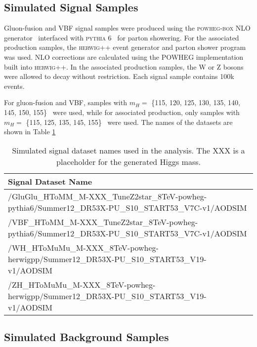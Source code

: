 \subsection{Simulated Signal Samples}

Gluon-fusion and VBF signal samples were produced using the \textsc{powheg-box} NLO generator~\cite{powheg} 
interfaced with \textsc{pythia} 6~\cite{pythia} for parton showering.
For the associated production samples, the \textsc{herwig}++ event generator and 
parton shower program~\cite{herwigpp} was used.  NLO corrections are calculated using the 
POWHEG implementation built into \textsc{herwig}++. 
In the associated production samples, the W or Z bosons were allowed to decay without restriction.
Each signal sample contains 100k events.

For gluon-fusion and VBF, samples with
$m_H =$ \{115, 120, 125, 130, 135, 140, 145, 150, 155\}~\GeVcc 
were used, while for associated production, only samples with 
$m_H =$ \{115, 125, 135, 145, 155\}~\GeVcc
were used.  The names of the datasets are shown in Table \ref{tab:sigDatasets}

\begin{table}[htb]
\caption{Simulated signal dataset names used in the analysis. The XXX is a placeholder
for the generated Higgs mass.
\label{tab:sigDatasets}
}
\small
\begin{center}
\begin{tabular}{ |p{12cm}|}
\hline
Signal Dataset Name \\
\hline
\hline
/GluGlu\_HToMM\_M-XXX\_TuneZ2star\_8TeV-powheg-pythia6/Summer12\_DR53X-PU\_S10\_START53\_V7C-v1/AODSIM \\
\hline
/VBF\_HToMM\_M-XXX\_TuneZ2star\_8TeV-powheg-pythia6/Summer12\_DR53X-PU\_S10\_START53\_V7C-v1/AODSIM \\
\hline
/WH\_HToMuMu\_M-XXX\_8TeV-powheg-herwigpp/Summer12\_DR53X-PU\_S10\_START53\_V19-v1/AODSIM \\
\hline
/ZH\_HToMuMu\_M-XXX\_8TeV-powheg-herwigpp/Summer12\_DR53X-PU\_S10\_START53\_V19-v1/AODSIM \\
\hline
\end{tabular}
\end{center}
\end{table}


\subsection{Simulated Background Samples}


